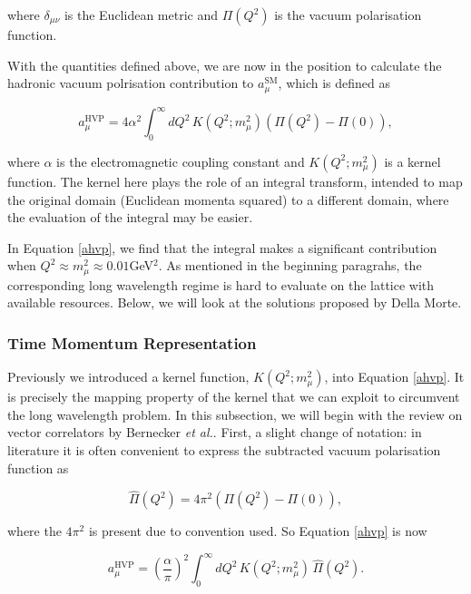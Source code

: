 \documentclass{article}
\numberwithin{equation}{section} %
\begin{document}
\noindent where $\delta_{\mu\nu}$ is the Euclidean metric and $\Pi(Q^2)$ is the vacuum polarisation function.

With the quantities defined above, we are now in the position to calculate the hadronic vacuum polrisation contribution to $a_\mu^\mathrm{SM}$, which is defined as 

\begin{equation}
a_\mu^\mathrm{HVP} = 4\alpha^2 \int_0^\infty dQ^2 \, K(Q^2;m_\mu^2) \left(\Pi(Q^2) - \Pi(0) \right),
\label{ahvp}
\end{equation}

\noindent where $\alpha$ is the electromagnetic coupling constant and $K(Q^2;m_\mu^2)$ is a kernel function. The kernel here plays the role of an integral transform, intended to map the original domain (Euclidean momenta squared) to a different domain, where the evaluation of the integral may be easier. 

In Equation \ref{ahvp}, we find that the integral makes a significant contribution when $Q^2\approx m_\mu^2\approx 0.01$GeV$^2$. As mentioned in the beginning paragrahs, the corresponding long wavelength regime is hard to evaluate on the lattice with available resources. Below, we will look at the solutions proposed by Della Morte\cite{dellamorte}.

\subsubsection{Time Momentum Representation}\label{tmr}

Previously we introduced a kernel function, $K(Q^2;m_\mu^2)$, into Equation \ref{ahvp}. It is precisely the mapping property of the kernel that we can exploit to circumvent the long wavelength problem. In this subsection, we will begin with the review on vector correlators by Bernecker \textit{et al.}\cite{vector}. First, a slight change of notation: in literature it is often convenient to express the subtracted vacuum polarisation function as

\begin{equation}
\hat{\Pi}(Q^2) = 4\pi^2(\Pi(Q^2) - \Pi(0)),
\end{equation}

\noindent where the $4\pi^2$ is present due to convention used. So Equation \ref{ahvp} is now 

\begin{equation}
a_\mu^\mathrm{HVP} = \left(\frac{\alpha}{\pi}\right)^2 \int_0^\infty dQ^2 \, K(Q^2;m_\mu^2) \,\hat{\Pi}(Q^2).
\end{equation}
\end{document}
